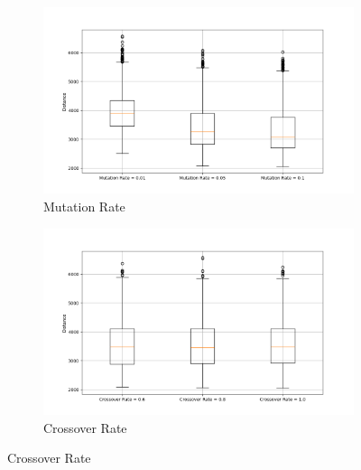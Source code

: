 \documentclass[11pt]{article}
\begin{document}
\begin{figure}[H]
    \centering
    \begin{subfigure}{0.45\textwidth}
        \includegraphics[width=\textwidth]{../results/mutation_rate_boxplot.png}
        \caption{Mutation Rate}
        \label{fig:m_rate}
    \end{subfigure}
    \begin{subfigure}{0.45\textwidth}
        \includegraphics[width=\textwidth]{../results/crossover_rate_boxplot.png}
        \caption{Crossover Rate}
        \label{fig:c_rate}
    \end{subfigure}
\end{figure}
    
\end{document}
